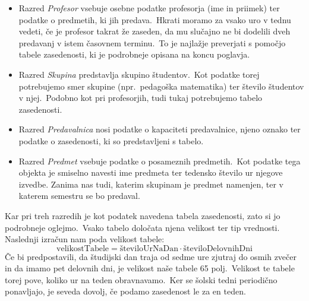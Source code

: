 \documentclass[a4paper,10pt]{article}
\begin{document}

\begin{itemize}
   \item Razred \emph{Profesor} vsebuje osebne podatke profesorja (ime in priimek) ter
   podatke o predmetih, ki jih predava.\ Hkrati moramo za vsako uro v tednu vedeti, če
   je profesor takrat že zaseden, da mu slučajno ne bi dodelili dveh predavanj v istem
   časovnem terminu.\ To je najlažje preverjati s pomočjo tabele zasedenosti, ki je
   podrobneje opisana na koncu poglavja.

   \item Razred \emph{Skupina} predstavlja skupino študentov.\ Kot podatke torej potrebujemo
   smer skupine (npr.\ pedagoška matematika) ter število študentov v njej.\ Podobno kot pri
   profesorjih, tudi tukaj potrebujemo tabelo zasedenosti.

   \item Razred \emph{Predavalnica} nosi podatke o kapaciteti predavalnice, njeno oznako
   ter podatke o zasedenosti, ki so predstavljeni s tabelo.

   \item Razred \emph{Predmet} vsebuje podatke o posameznih predmetih.\ Kot podatke tega
   objekta je smiselno navesti ime predmeta ter tedensko število ur njegove izvedbe.
   Zanima nas tudi, katerim skupinam je predmet namenjen, ter v katerem semestru se bo
   predaval.
   \end{itemize}

Kar pri treh razredih je kot podatek navedena tabela zasedenosti, zato si jo podrobneje
oglejmo.\ Vsako tabelo določata njena velikost ter tip vrednosti.
 Naslednji izračun nam poda velikost tabele:
 \[
\text{velikostTabele} = \text{številoUrNaDan} \cdot \text{številoDelovnihDni}
\]
Če bi predpostavili, da študijski dan traja od sedme ure zjutraj do osmih zvečer in da
imamo pet delovnih dni, je velikost naše tabele 65 polj.\ Velikost te tabele torej pove,
koliko ur na teden obravnavamo.\ Ker se šolski tedni periodično ponavljajo, je seveda
dovolj, če podamo zasedenost le za en teden.
\end{document}
